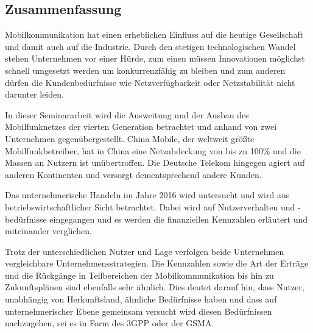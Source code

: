 \subsection*{Zusammenfassung}
\pagestyle{empty}

Mobilkommunikation hat einen erheblichen Einfluss auf die heutige Gesellschaft und damit auch auf die Industrie. Durch den stetigen technologischen Wandel stehen Unternehmen vor einer Hürde, zum einen müssen Innovationen möglichst schnell umgesetzt werden um konkurrenzfähig zu bleiben und zum anderen dürfen die Kundenbedürfnisse wie Netzverfügbarkeit oder Netzstabilität nicht darunter leiden.

In dieser Seminararbeit wird die Ausweitung und der Ausbau des Mobilfunknetzes der vierten Generation betrachtet und anhand von zwei Unternehmen gegenübergestellt. China Mobile, der weltweit größte Mobilfunkbetreiber, hat in China eine Netzabdeckung von bis zu 100$\%$ und die Massen an Nutzern ist unübertroffen. Die Deutsche Telekom hingegen agiert auf anderen Kontinenten und versorgt dementsprechend andere Kunden. 

Das unternehmerische Handeln im Jahre 2016 wird untersucht und wird aus betriebswirtschaftlicher Sicht betrachtet. Dabei wird auf Nutzerverhalten und -bedürfnisse eingegangen und es werden die finanziellen Kennzahlen erläutert und miteinander verglichen. 

Trotz der unterschiedlichen Nutzer und Lage verfolgen beide Unternehmen vergleichbare Unternehmensstrategien. Die Kennzahlen sowie die Art der Erträge und die Rückgänge in Teilbereichen der Mobilkommunikation bis hin zu Zukunftsplänen sind ebenfalls sehr ähnlich. Dies deutet darauf hin, dass Nutzer, unabhängig von Herkunftsland, ähnliche Bedürfnisse haben und dass auf unternehmerischer Ebene gemeinsam versucht wird diesen Bedürfnissen nachzugehen, sei es in Form des 3GPP oder der GSMA.  


